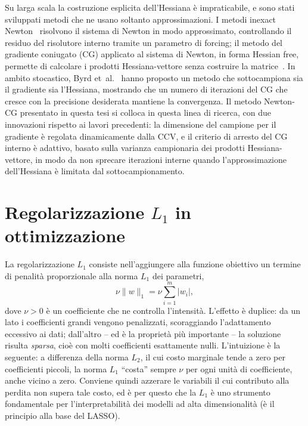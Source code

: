 \documentclass[italian, a4paper, twoside, binding=6mm]{sapthesis}
\begin{document}
Su larga scala la costruzione esplicita dell'Hessiana è impraticabile, e sono
stati sviluppati metodi che ne usano soltanto approssimazioni. I metodi
inexact Newton~\cite{dembo1982} risolvono il sistema di Newton in modo
approssimato, controllando il residuo del risolutore interno tramite un
parametro di forcing; il metodo del gradiente coniugato (CG) applicato al
sistema di Newton, in forma Hessian free, permette di calcolare i
prodotti Hessiana-vettore senza costruire la matrice~\cite{shewchuk1994,
nocedal2006}. In ambito stocastico, Byrd et~al.~\cite{byrd2011} hanno proposto
un metodo che sottocampiona sia il gradiente sia l'Hessiana, mostrando che un
numero di iterazioni del CG che cresce con la precisione desiderata mantiene la
convergenza. Il metodo Newton-CG presentato in questa tesi si colloca in questa
linea di ricerca, con due innovazioni rispetto ai lavori precedenti: la
dimensione del campione per il gradiente è regolata dinamicamente dalla CCV, e
il criterio di arresto del CG interno è adattivo, basato sulla varianza
campionaria dei prodotti Hessiana-vettore, in modo da non sprecare iterazioni
interne quando l'approssimazione dell'Hessiana è limitata dal sottocampionamento.

\section{Regolarizzazione $L_1$ in ottimizzazione}

La regolarizzazione $L_1$ consiste nell'aggiungere alla funzione obiettivo un
termine di penalità proporzionale alla norma $L_1$ dei parametri,
\[
\nu\|w\|_1 = \nu \sum_{i=1}^{m} |w_i|,
\]
dove $\nu > 0$ è un coefficiente che ne controlla l'intensità. L'effetto è
duplice: da un lato i coefficienti grandi vengono penalizzati, scoraggiando
l'adattamento eccessivo ai dati; dall'altro -- ed è la proprietà più
importante -- la soluzione risulta \emph{sparsa}, cioè con molti coefficienti
esattamente nulli. L'intuizione è la seguente: a differenza della norma $L_2$,
il cui costo marginale tende a zero per coefficienti piccoli, la norma $L_1$
``costa'' sempre $\nu$ per ogni unità di coefficiente, anche vicino a zero.
Conviene quindi azzerare le variabili il cui contributo alla perdita non
supera tale costo, ed è per questo che la $L_1$ è uno strumento fondamentale
per l'interpretabilità dei modelli ad alta dimensionalità (è il principio alla
base del LASSO).
\end{document}
